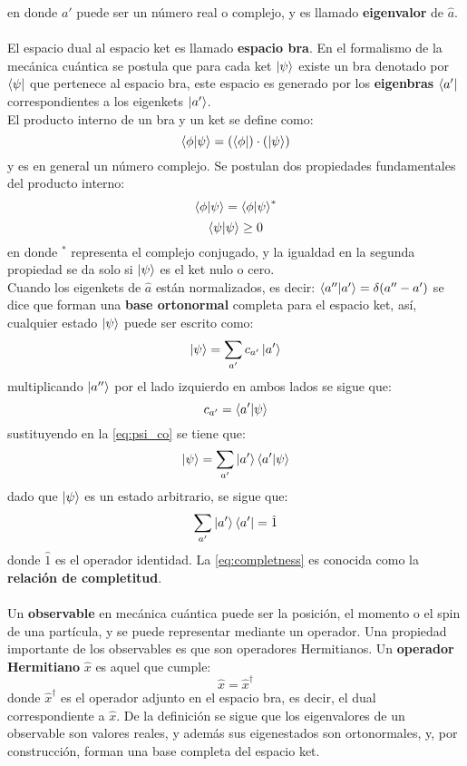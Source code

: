 en donde $a'$ puede ser un número real o complejo, y es llamado \textbf{eigenvalor} de $\hat{a}$.
\\
\\
El espacio dual al espacio ket es llamado \textbf{espacio bra}. En el formalismo de la mecánica cuántica se postula que para cada ket $\ket{\psi}$ existe un bra denotado por $\bra{\psi}$ que pertenece al espacio bra, este espacio es generado por los \textbf{eigenbras} $\bra{a'}$ correspondientes a los eigenkets $\ket{a'}$.
\\
El producto interno de un bra y un ket se define como:
\[ \bra{\phi}\ket{\psi} = (\bra{\phi})\cdot (\ket{\psi}) \]
y es en general un número complejo. Se postulan dos propiedades fundamentales del producto interno:
\[ \bra{\phi}\ket{\psi} = \bra{\phi}\ket{\psi}^* \]
\[ \bra{\psi}\ket{\psi} \geq 0 \]
en donde $^*$ representa el complejo conjugado, y la igualdad en la segunda propiedad se da solo si $\ket{\psi}$ es el ket nulo o cero.
\\
Cuando los eigenkets de $\hat{a}$ están normalizados, es decir: $\bra{a''}\ket{a'}=\delta(a''-a')$ se dice que forman una \textbf{base ortonormal} completa para el espacio ket, así, cualquier estado $\ket{\psi}$ puede ser escrito como:
\begin{equation}
 \ket{\psi} = \sum_{a'}c_{a'}\ket{a'}\label{eq:psi_co}
\end{equation}
multiplicando $\ket{a''}$ por el lado izquierdo en ambos lados se sigue que:
\[ c_{a'} = \bra{a'}\ket{\psi} \]
sustituyendo en la \autoref{eq:psi_co} se tiene que:
\begin{equation}
  \ket{\psi} = \sum_{a'}\ket{a'}\bra{a'}\ket{\psi}
\end{equation}
dado que $\ket{\psi}$ es un estado arbitrario, se sigue que:
\begin{equation}
  \label{eq:completness}
  \sum_{a'}\ket{a'}\bra{a'} = \hat{1}
\end{equation}
donde $\hat{1}$ es el operador identidad. La \autoref{eq:completness} es conocida como la \textbf{relación de completitud}.
\\
\\
Un \textbf{observable} en mecánica cuántica puede ser la posición, el momento o el spin de una partícula, y se puede representar mediante un operador. Una propiedad importante de los observables es que son operadores Hermitianos. Un \textbf{operador Hermitiano} $\hat{x}$ es aquel que cumple:
\[ \hat{x} = \hat{x}^\dag\]
donde $\hat{x}^\dag$ es el operador adjunto en el espacio bra, es decir, el dual correspondiente a $\hat{x}$. De la definición se sigue que los eigenvalores de un observable son valores reales, y además sus eigenestados son ortonormales, y, por construcción, forman una base completa del espacio ket.

